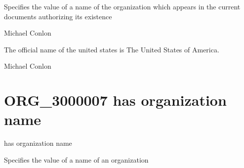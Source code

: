 \documentclass[letterpaper,10pt,english]{sphinxmanual}
\begin{document}
\begin{sphinxShadowBox}

\sphinxAtStartPar
Specifies the value of a name of the organization which appears in the current documents authorizing its existence
\end{sphinxShadowBox}

\begin{sphinxShadowBox}

\sphinxAtStartPar
Michael Conlon 
\end{sphinxShadowBox}

\begin{sphinxShadowBox}

\sphinxAtStartPar
The official name of the united states is The United States of America.
\end{sphinxShadowBox}

\begin{sphinxShadowBox}

\sphinxAtStartPar
Michael Conlon 
\end{sphinxShadowBox}
\begin{quote}

\ignorespaces \end{quote}


\section{ORG\_3000007 \sphinxhyphen{} has organization name}
\label{\detokenize{doc-ORG_3000007:org-3000007-has-organization-name}}\label{\detokenize{doc-ORG_3000007:index-0}}\label{\detokenize{doc-ORG_3000007::doc}}
\begin{sphinxShadowBox}

\sphinxAtStartPar
has organization name
\end{sphinxShadowBox}

\begin{sphinxShadowBox}

\sphinxAtStartPar
Specifies the value of a name of an organization
\end{sphinxShadowBox}
\end{document}
